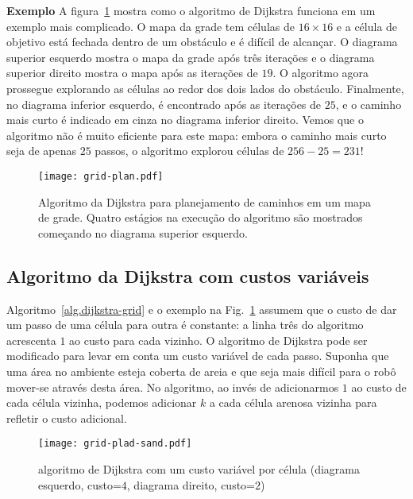 {\smallskip

\noindent\textbf{Exemplo} A figura~\ref{fig.dijkstra} mostra como o algoritmo de Dijkstra funciona em um exemplo mais complicado. O mapa da grade tem células de $16\times 16$ e a célula de objetivo  está fechada dentro de um obstáculo e é difícil de alcançar. O diagrama superior esquerdo mostra o mapa da grade após três iterações e o diagrama superior direito mostra o mapa após as iterações de $19$. O algoritmo agora prossegue explorando as células ao redor dos dois lados do obstáculo. Finalmente, no diagrama inferior esquerdo,  é encontrado após as iterações de $25$, e o caminho mais curto é indicado em cinza no diagrama inferior direito. Vemos que o algoritmo não é muito eficiente para este mapa: embora o caminho mais curto seja de apenas $25$ passos, o algoritmo explorou células de $256-25=231$!

\begin{figure}
\begin{center}
\texttt{[image: grid-plan.pdf]}
\end{center}
\caption{Algoritmo da Dijkstra para planejamento de caminhos em um mapa de grade. Quatro estágios na execução do algoritmo são mostrados começando no diagrama superior esquerdo.}\label{fig.dijkstra}
\end{figure}

\subsection{Algoritmo da Dijkstra com custos variáveis}

Algoritmo~\ref{alg.dijkstra-grid} e o exemplo na Fig.~\ref{fig.dijkstra} assumem que o custo de dar um passo de uma célula para outra é constante: a linha três do algoritmo acrescenta $1$ ao custo para cada vizinho. O algoritmo de Dijkstra pode ser modificado para levar em conta um custo variável de cada passo. Suponha que uma área no ambiente esteja coberta de areia e que seja mais difícil para o robô mover-se através desta área. No algoritmo, ao invés de adicionarmos $1$ ao custo de cada célula vizinha, podemos adicionar $k$ a cada célula arenosa vizinha para refletir o custo adicional.

\begin{figure}
\begin{center}
\texttt{[image: grid-plad-sand.pdf]}
\end{center}
\caption{algoritmo de Dijkstra com um custo variável por célula (diagrama esquerdo, custo=$4$, diagrama direito, custo=$2$)}\label{fig.path-sand}
\end{figure}

}
